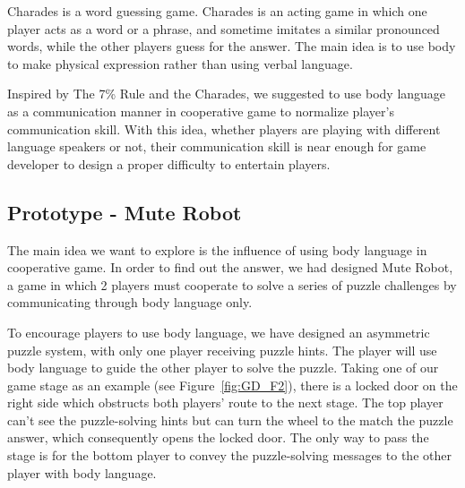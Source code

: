 Charades\cite{GD3} is a word guessing game. Charades is an acting game in which one player acts as a word or a phrase, and sometime imitates a similar pronounced words, while the other players guess for the answer. The main idea is to use body to make physical expression rather than using verbal language. 


Inspired by The 7\% Rule and the Charades, we suggested to use body language as a communication manner in cooperative game to normalize player's communication skill. With this idea, whether players are playing with different language speakers or not, their communication skill is near enough for game developer to design a proper difficulty to entertain players.


\subsection{Prototype - Mute Robot}


The main idea we want to explore is the influence of using body language in cooperative game. In order to find out the answer, we had designed Mute Robot, a game in which 2 players must cooperate to solve a series of puzzle challenges by communicating through body language only.

To encourage players to use body language, we have designed an asymmetric puzzle system, with only one player receiving puzzle hints. The player will use body language to guide the other player to solve the puzzle. Taking one of our game stage as an example (see Figure~\ref{fig:GD_F2}), there is a locked door on the right side which obstructs both players’ route to the next stage. The top player can’t see the puzzle-solving hints but can turn the wheel to the match the puzzle answer, which consequently opens the locked door. The only way to pass the stage is for the bottom player to convey the puzzle-solving messages to the other player with body language.

